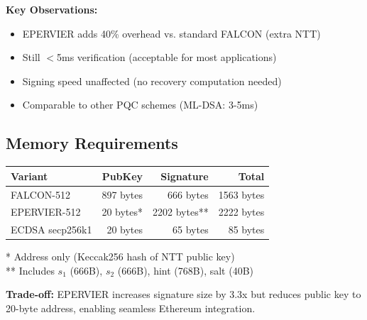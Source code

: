 \textbf{Key Observations:}
\begin{itemize}
    \item EPERVIER adds 40\% overhead vs. standard FALCON (extra NTT)
    \item Still $<$5ms verification (acceptable for most applications)
    \item Signing speed unaffected (no recovery computation needed)
    \item Comparable to other PQC schemes (ML-DSA: 3-5ms)
\end{itemize}

\subsection{Memory Requirements}

\begin{center}
\begin{tabular}{lrrr}
\hline
\textbf{Variant} & \textbf{PubKey} & \textbf{Signature} & \textbf{Total} \\
\hline
FALCON-512 & 897 bytes & 666 bytes & 1563 bytes \\
EPERVIER-512 & 20 bytes* & 2202 bytes** & 2222 bytes \\
ECDSA secp256k1 & 20 bytes & 65 bytes & 85 bytes \\
\hline
\end{tabular}
\end{center}

* Address only (Keccak256 hash of NTT public key) \\
** Includes $s_1$ (666B), $s_2$ (666B), hint (768B), salt (40B)

\textbf{Trade-off:} EPERVIER increases signature size by 3.3x but reduces public key to 20-byte address, enabling seamless Ethereum integration.

